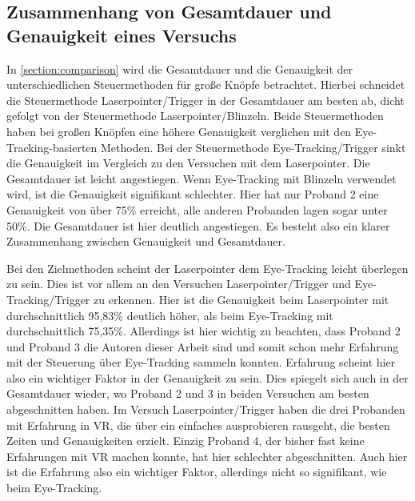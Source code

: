 \subsection{Zusammenhang von Gesamtdauer und Genauigkeit eines Versuchs}
In \autoref{section:comparison} wird die Gesamtdauer und die Genauigkeit der unterschiedlichen Steuermethoden für große Knöpfe betrachtet. Hierbei schneidet die Steuermethode Laserpointer/Trigger in der Gesamtdauer am besten ab, dicht gefolgt von der Steuermethode Laserpointer/Blinzeln. Beide Steuermethoden haben bei großen Knöpfen eine höhere Genauigkeit verglichen mit den Eye-Tracking-basierten Methoden. Bei der Steuermethode Eye-Tracking/Trigger sinkt die Genauigkeit im Vergleich zu den Versuchen mit dem Laserpointer. Die Gesamtdauer ist leicht angestiegen. Wenn Eye-Tracking mit Blinzeln verwendet wird, ist die Genauigkeit signifikant schlechter. Hier hat nur Proband 2 eine Genauigkeit von über 75\% erreicht, alle anderen Probanden lagen sogar unter 50\%. Die Gesamtdauer ist hier deutlich angestiegen. Es besteht also ein klarer Zusammenhang zwischen Genauigkeit und Gesamtdauer. 

Bei den Zielmethoden scheint der Laserpointer dem Eye-Tracking leicht überlegen zu sein. Dies ist vor allem an den Versuchen Laserpointer/Trigger und Eye-Tracking/Trigger zu erkennen. Hier ist die Genauigkeit beim Laserpointer mit durchschnittlich 95,83\% deutlich höher, als beim Eye-Tracking mit durchschnittlich 75,35\%. Allerdings ist hier wichtig zu beachten, dass Proband 2 und Proband 3 die Autoren dieser Arbeit sind und somit schon mehr Erfahrung mit der Steuerung über Eye-Tracking sammeln konnten. Erfahrung scheint hier also ein wichtiger Faktor in der Genauigkeit zu sein. Dies spiegelt sich auch in der Gesamtdauer wieder, wo Proband 2 und 3 in beiden Versuchen am besten abgeschnitten haben. Im Versuch Laserpointer/Trigger haben die drei Probanden mit Erfahrung in \ac{VR}, die über ein einfaches ausprobieren rausgeht, die besten Zeiten und Genauigkeiten erzielt. Einzig Proband 4, der bisher fast keine Erfahrungen mit \ac{VR} machen konnte, hat hier schlechter abgeschnitten. Auch hier ist die Erfahrung also ein wichtiger Faktor, allerdings nicht so signifikant, wie beim Eye-Tracking. 

